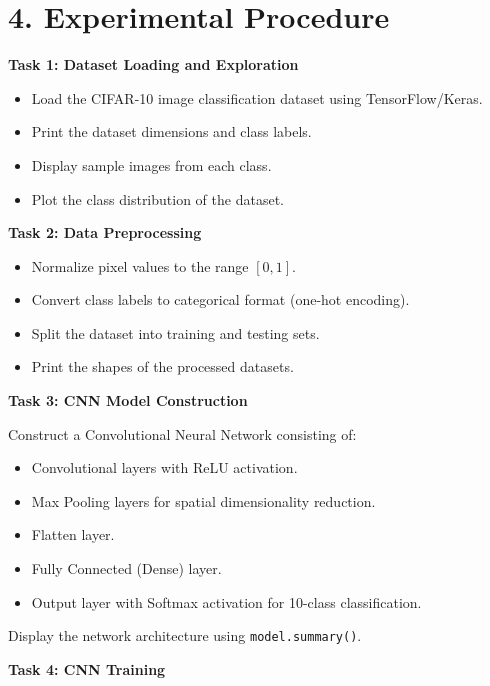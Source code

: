 \documentclass[11pt]{article}
\begin{document}
\section*{4. Experimental Procedure}

\textbf{Task 1: Dataset Loading and Exploration}

\begin{itemize}
    \item Load the CIFAR-10 image classification dataset using TensorFlow/Keras.
    \item Print the dataset dimensions and class labels.
    \item Display sample images from each class.
    \item Plot the class distribution of the dataset.
\end{itemize}


\bigskip

\textbf{Task 2: Data Preprocessing}

\begin{itemize}
    \item Normalize pixel values to the range $[0,1]$.
    \item Convert class labels to categorical format (one-hot encoding).
    \item Split the dataset into training and testing sets.
    \item Print the shapes of the processed datasets.
\end{itemize}


\bigskip

\textbf{Task 3: CNN Model Construction}

Construct a Convolutional Neural Network consisting of:

\begin{itemize}
    \item Convolutional layers with ReLU activation.
    \item Max Pooling layers for spatial dimensionality reduction.
    \item Flatten layer.
    \item Fully Connected (Dense) layer.
    \item Output layer with Softmax activation for 10-class classification.
\end{itemize}

Display the network architecture using \texttt{model.summary()}.


\bigskip

\textbf{Task 4: CNN Training}
\end{document}

